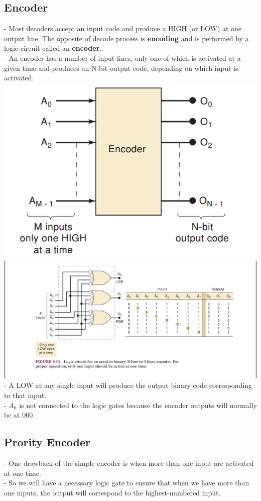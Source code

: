 \documentclass[12pt]{article}
\begin{document}
\subsection{Encoder}
- Most decoders accept an input code and produce a HIGH (or LOW) at one output line. The opposite of decode process is \textbf{encoding} and is performed by a logic circuit called an \textbf{encoder}. \\
- An encoder has a number of input lines, only one of which is activated at a given time and produces an N-bit output code, depending on which input is activated. \\
\includegraphics[scale = 0.7]{hinh58}
\bigbreak
\includegraphics[scale = 0.6]{hinh59}
\bigbreak
- A LOW at any single input will produce the output binary code corresponding to that input. \\
- $A_{0}$ is not connected to the logic gates because the encoder outputs will normally be at 000. \\
\subsection{Prority Encoder}
- One drawback of the simple encoder is when more than one input are activated at one time. \\
- So we will have a necessary logic gate to ensure that when we have more than one inputs, the output will correspond to the highest-numbered input. \\
\end{document}
